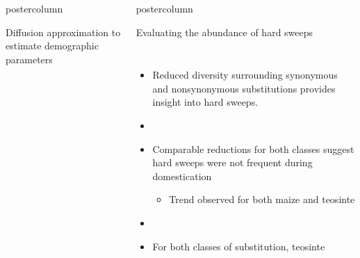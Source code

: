 \documentclass[final]{beamer}
\newlength{\columnheight}
\begin{document}
\begin{frame}
\begin{columns}
\begin{column}{.49\textwidth}
\begin{beamercolorbox}[center,wd=\textwidth]{postercolumn}
\begin{minipage}[T]{.95\textwidth}
{\begin{block}{Diffusion approximation to estimate demographic parameters}
\begin{columns}
              \end{columns}
            \end{block}
            \vspace{6cm}
            }
        \end{minipage}
      \end{beamercolorbox}
    \end{column}

    \begin{column}{.49\textwidth}
      \begin{beamercolorbox}[center,wd=\textwidth]{postercolumn}
        \begin{minipage}[T]{.95\textwidth} %
          \parbox[t][\columnheight]{\textwidth}{ %
            \begin{block}{Evaluating the abundance of hard sweeps}
              \begin{columns}
              \begin{itemize}
                \item Reduced diversity surrounding synonymous and
                  nonsynonymous substitutions provides insight into
                  hard sweeps.
                \item[]
                \item Comparable reductions for both classes suggest
                  hard sweeps were not frequent during domestication
                  \begin{itemize}
                    \item Trend observed for both maize and teosinte
                  \end{itemize}
                \item[]
                \item For both classes of substitution, teosinte

\end{itemize}
\end{columns}
\end{block}}
\end{minipage}
\end{beamercolorbox}
\end{column}
\end{columns}
\end{frame}
\end{document}
